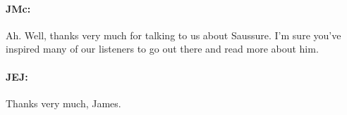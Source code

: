 \documentclass[output=paper]{langscibook}
\begin{document}
\paragraph*{JMc:}  Ah. Well, thanks very much for talking to us about Saussure. I’m sure you’ve inspired many of our listeners to go out there and read more about him.


\paragraph*{JEJ:}  Thanks very much, James.

\nocite{arnauld1660a}
\nocite{arnauld1975a}
\nocite{benveniste2012a}
\nocite{benveniste2019a}
\nocite{bloomfield1924a}
\nocite{bloomfield1933a}
\nocite{boas1911a}
\nocite{firth1950a}
\nocite{Hjelmslev1928}
\nocite{hjelmslev1935a}
\nocite{jakobson1962a}
\nocite{jakobson1971a}
\nocite{meillet1921a}
\nocite{ogden1949a}
\nocite{saussure1879a}
\nocite{saussure1922a}
\nocite{saussure1959a}
\nocite{chomsky2009a}
\nocite{coseriu1967a}
\nocite{joseph2012a}
\nocite{joseph2017a}
\nocite{joseph2020a}
\nocite{mcelvenny2017a}
\nocite{mcelvenny2018a}


\sloppy
\PrintPrimarySources{}
\PrintSecondarySources{}
\end{document}
